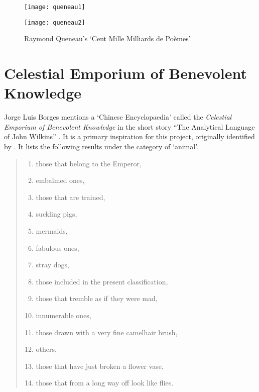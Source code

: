 \begin{figure}[!htbp]
\centering
\begin{minipage}{.45\linewidth}
  \texttt{[image: queneau1]}
\end{minipage}
\hspace{.05\linewidth}
\begin{minipage}{.45\linewidth}
  \texttt{[image: queneau2]}
\end{minipage}
\caption[Queneau's `Cent Mille Milliards de Poèmes']{Raymond Queneau's `Cent Mille Milliards de Poèmes'\footnotemark}
\label{fig:queneau12}
\end{figure}


\section{Celestial Emporium of Benevolent Knowledge}
\label{s:borges}

Jorge Luis Borges mentions a `Chinese Encyclopaedia' called the \emph{Celestial Emporium of Benevolent Knowledge} in the short story ``The Analytical Language of John Wilkins'' \citeyear{Borges2000}. It is a primary inspiration for this project, originally identified by \autocite{Hendler2011, Hendler2013}. It lists the following results under the category of `animal'.

\begin{quotation}
\begin{enumerate}
  \item those that belong to the Emperor,
  \item embalmed ones,
  \item those that are trained,
  \item suckling pigs,
  \item mermaids,
  \item fabulous ones,
  \item stray dogs,
  \item those included in the present classification,
  \item those that tremble as if they were mad,
  \item innumerable ones,
  \item those drawn with a very fine camelhair brush,
  \item others,
  \item those that have just broken a flower vase,
  \item those that from a long way off look like flies.
\end{enumerate}
\end{quotation}

